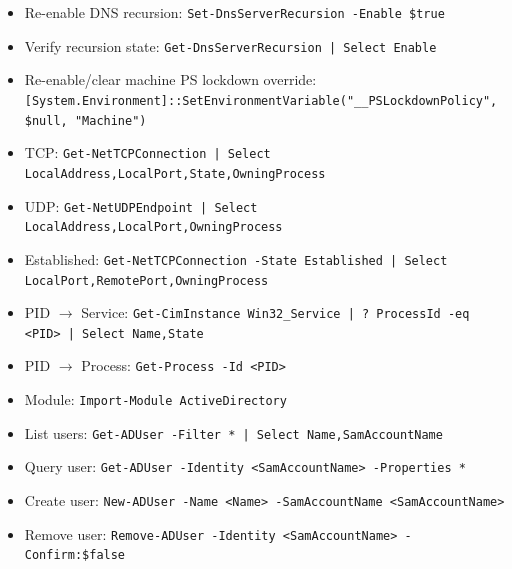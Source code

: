 \documentclass[10pt]{article}
\begin{document}
\begin{tcolorbox}[title=Containment Rollback (Re-Enable)]
\begin{itemize}[leftmargin=1.1em, itemsep=1pt, topsep=2pt]
  \item Re-enable DNS recursion: \verb!Set-DnsServerRecursion -Enable $true!
  \item Verify recursion state: \verb!Get-DnsServerRecursion | Select Enable!
  \item Re-enable/clear machine PS lockdown override: \verb![System.Environment]::SetEnvironmentVariable("__PSLockdownPolicy", $null, "Machine")!
\end{itemize}
\end{tcolorbox}

\begin{tcolorbox}[title=Current Ports In Use]
\begin{itemize}[leftmargin=1.1em, itemsep=1pt, topsep=2pt]
  \item TCP: \verb!Get-NetTCPConnection | Select LocalAddress,LocalPort,State,OwningProcess!
  \item UDP: \verb!Get-NetUDPEndpoint | Select LocalAddress,LocalPort,OwningProcess!
  \item Established: \verb!Get-NetTCPConnection -State Established | Select LocalPort,RemotePort,OwningProcess!
  \item PID $\rightarrow$ Service: \verb!Get-CimInstance Win32_Service | ? ProcessId -eq <PID> | Select Name,State!
  \item PID $\rightarrow$ Process: \verb!Get-Process -Id <PID>!
\end{itemize}
\end{tcolorbox}

\begin{tcolorbox}[title=AD Users (Create / Remove / Query)]
\begin{itemize}[leftmargin=1.1em, itemsep=1pt, topsep=2pt]
  \item Module: \verb!Import-Module ActiveDirectory!
  \item List users: \verb!Get-ADUser -Filter * | Select Name,SamAccountName!
  \item Query user: \verb!Get-ADUser -Identity <SamAccountName> -Properties *!
  \item Create user: \verb!New-ADUser -Name <Name> -SamAccountName <SamAccountName>!
  \item Remove user: \verb!Remove-ADUser -Identity <SamAccountName> -Confirm:$false!
\end{itemize}
\end{tcolorbox}
\end{document}
